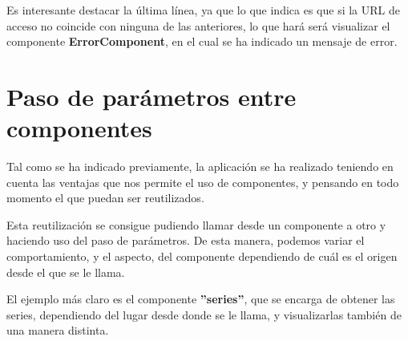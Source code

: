 \documentclass{\ClassPath/viu-tfm-template}
\begin{document}
Es interesante destacar la última línea, ya que lo que indica es que si la URL de acceso no coincide con ninguna de las anteriores, lo que hará será visualizar el componente \textbf{ErrorComponent}, en el cual se ha indicado un mensaje de error.


\section{Paso de parámetros entre componentes}

Tal como se ha indicado previamente, la aplicación se ha realizado teniendo en cuenta las ventajas que nos permite el uso de componentes, y pensando en todo momento el que puedan ser reutilizados.

Esta reutilización se consigue pudiendo llamar desde un componente a otro y haciendo uso del paso de parámetros. De esta manera, podemos variar el comportamiento, y el aspecto, del componente dependiendo de cuál es el origen desde el que se le llama.

El ejemplo más claro es el componente \textbf{”series”}, que se encarga de obtener las series, dependiendo del lugar desde donde se le llama, y visualizarlas también de una manera distinta.
\end{document}

